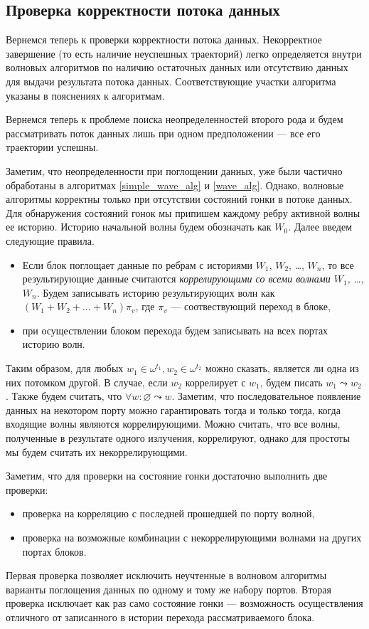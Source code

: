 \documentclass[10pt,a4paper]{article}
\begin{document}
\subsection{Проверка корректности потока данных}
  Вернемся теперь к проверки корректности потока данных.
  Некорректное завершение (то есть наличие неуспешных траекторий) легко определяется внутри волновых алгоритмов
  по наличию остаточных данных или отсутствию данных для выдачи результата потока данных. Соответствующие участки алгоритма указаны в пояснениях к алгоритмам.
  
  Вернемся теперь к проблеме поиска неопределенностей второго рода и будем рассматривать поток данных лишь при одном предположении --- все его траектории успешны.
  
  Заметим, что неопределенности при поглощении данных, уже были частично обработаны в алгоритмах \ref{simple_wave_alg} и \ref{wave_alg}.
  Однако, волновые алгоритмы корректны только при отсутствии состояний гонки в потоке данных.
  Для обнаружения состояний гонок мы припишем каждому ребру активной волны ее историю.
  Историю начальной волны будем обозначать как $W_0$. Далее введем следующие правила.
  \begin{itemize}
    \item Если блок поглощает данные по ребрам с историями $W_1$, $W_2$, \dots, $W_n$, то
    все результирующие данные считаются \textit{коррелирующими со всеми волнами $W_1$, \dots, $W_n$}. Будем записывать историю результирующих волн как $(W_1 + W_2 + \dots + W_n) \pi_v$,
    где $\pi_v$ --- соотвествующий переход в блоке,
    \item при осуществлении блоком перехода будем записывать на всех портах историю волн.
  \end{itemize}
  
  Таким образом, для любых $w_1 \in \omega^{t_1}, w_2 \in \omega^{t_2}$ можно сказать, является ли одна из них потомком другой.
  В случае, если $w_2$ коррелирует с $w_1$, будем писать $w_1 \leadsto w_2$. Также будем считать, что $\forall w: \varnothing \leadsto w$.
  Заметим, что последовательное появление данных на некотором порту можно гарантировать тогда и только тогда, когда входящие волны являются коррелирующими.
  Можно считать, что все волны, полученные в результате одного излучения, коррелируют, однако для простоты мы будем считать их некоррелирующими.
  
  Заметим, что для проверки на состояние гонки достаточно выполнить две проверки:
  \begin{itemize}
    \item проверка на корреляцию с последней прошедшей по порту волной,
    \item проверка на возможные комбинации с некоррелирующими волнами на других портах блоков.
  \end{itemize}
  Первая проверка позволяет исключить неучтенные в волновом алгоритмы варианты поглощения данных по одному и тому же набору портов.
  Вторая проверка исключает как раз само состояние гонки --- возможность осуществления отличного от записанного в истории перехода рассматриваемого блока.
  
\end{document}
